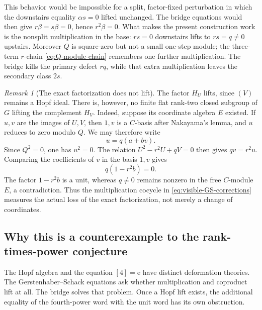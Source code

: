 \documentclass[11pt]{amsart}
\theoremstyle{definition}
\theoremstyle{remark}
\newtheorem{remark}[theorem]{Remark}
\newcommand{\unit}{\mathrm e}
\begin{document}
This behavior would be impossible for a split, factor-fixed perturbation
in which the downstairs equality \(\alpha s=0\) lifted unchanged.  The
bridge equations would then give \(r\beta=s\beta=0\), hence
\(r^2\beta=0\).  What makes the present construction work is the
nonsplit multiplication in the base: \(rs=0\) downstairs lifts to
\(rs=q\ne0\) upstairs.  Moreover \(Q\) is square-zero but not a small
one-step module; the three-term \(r\)-chain
\eqref{eq:Q-module-chain} remembers one further multiplication.  The
bridge kills the primary defect \(rq\), while that extra multiplication
leaves the secondary class \(2s\).

\begin{remark}[The exact factorization does not lift]
\label{rem:factorization-does-not-lift}
The factor \(H_U\) lifts, since \((V)\) remains a Hopf ideal.  There is,
however, no finite flat rank-two closed subgroup of \(G\) lifting the
complement \(H_V\).  Indeed, suppose its coordinate algebra \(E\) existed.
If \(u,v\) are the images of \(U,V\), then \(1,v\) is a \(C\)-basis after
Nakayama's lemma, and \(u\) reduces to zero modulo \(Q\).  We may therefore
write
\[
 u=q(a+bv).
\]
Since \(Q^2=0\), one has \(u^2=0\).  The relation
\(U^2-r^2U+qV=0\) then gives \(qv=r^2u\).  Comparing the coefficients of
\(v\) in the basis \(1,v\) gives
\[
 q(1-r^2b)=0.
\]
The factor \(1-r^2b\) is a unit, whereas \(q\ne0\) remains nonzero in the
free \(C\)-module \(E\), a contradiction.  Thus the multiplication
cocycle in \eqref{eq:visible-GS-corrections} measures the actual loss of
the exact factorization, not merely a change of coordinates.
\end{remark}

\subsection{Why this is a counterexample to the rank-times-power conjecture}
\label{subsec:why-counterexample}

The Hopf algebra and the equation \([4]=\unit\) have distinct deformation
theories.  The Gerstenhaber--Schack equations ask whether multiplication
and coproduct lift at all.  The bridge solves that problem.  Once a Hopf
lift exists, the additional equality of the fourth-power word with the
unit word has its own obstruction.
\end{document}
